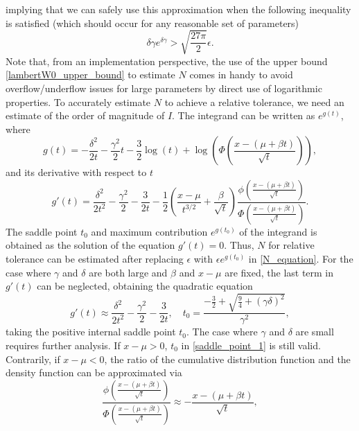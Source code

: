 \documentclass[10pt,a4paper,oneside]{article}
\numberwithin{equation}{section}
\begin{document}
implying that we can safely use this approximation when the following inequality is satisfied (which should occur for any reasonable set of parameters)
\begin{equation}
\delta \gamma e^{\delta\gamma} > \sqrt{\frac{27 \pi}{2}} \epsilon.
\end{equation}
Note that, from an implementation perspective, the use of the upper bound  \eqref{lambertW0_upper_bound} to estimate $N$ comes in handy to avoid overflow/underflow issues for large parameters by direct use of logarithmic properties. 
To accurately estimate $N$ to achieve a relative tolerance, we need an estimate of the order of magnitude of $I$. The integrand can be written as $e^{g(t)}$, where
\begin{equation}
g(t) = -\frac{\delta^2}{2t} - \frac{\gamma^2}{2}t - \frac{3}{2}\log(t) + \log\left(\Phi\left(\frac{x - (\mu +\beta t)}{\sqrt{t}}\right)\right),
\end{equation}
and its derivative with respect to $t$
\begin{equation}\label{saddle_point_equation}
g'(t) = \frac{\delta^2}{2t^2} -\frac{\gamma^2}{2} -\frac{3}{2t} -\frac{1}{2}\left(\frac{x-\mu}{t^{3/2}} + \frac{\beta}{\sqrt{t}} \right)\frac{\phi\left(\frac{x - (\mu +\beta t)}{\sqrt{t}}\right)}{\Phi\left(\frac{x - (\mu +\beta t)}{\sqrt{t}}\right)}.
\end{equation}
The saddle point $t_0$ and maximum contribution $e^{g(t_0)}$ of the integrand is obtained as the solution of the equation $g'(t) = 0$. Thus, $N$ for relative tolerance can be estimated after replacing $\epsilon$ with $\epsilon e^{g(t_0)}$ in \eqref{N_equation}. For the case where $\gamma$ and $\delta$ are both large and $\beta$ and $x-\mu$ are fixed, the last term in $g'(t)$ can be neglected, obtaining the quadratic equation
\begin{equation}\label{saddle_point_1}
g'(t) \approx \frac{\delta^2}{2t^2} -\frac{\gamma^2}{2} -\frac{3}{2t}, \quad t_0 = \frac{-\frac{3}{2} + \sqrt{\frac{9}{4} + (\gamma \delta)^2}}{\gamma^2},
\end{equation}
taking the positive internal saddle point $t_0$. The case where $\gamma$ and $\delta$ are small requires further analysis. If $x-\mu > 0$, $t_0$ in \eqref{saddle_point_1} is still valid. Contrarily, if $x -\mu < 0$, the ratio of the cumulative distribution function and the density function can be approximated via
\begin{equation*}
\frac{\phi\left(\frac{x - (\mu+ \beta t)}{\sqrt{t}}\right)}{\Phi\left(\frac{x - (\mu + \beta t)}{\sqrt{t}}\right)} \approx -\frac{x - (\mu + \beta t)}{\sqrt{t}},
\end{equation*}
\end{document}

